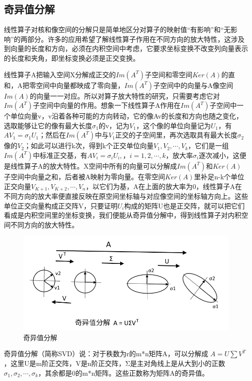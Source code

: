 \subsection{奇异值分解}

线性算子对核和像空间的分解只是简单地区分对算子的映射值“有影响”和“无影响”的两部分。许多的应用希望了解线性算子作用在不同方向的放大特性，这涉及到向量的长度和方向，必须在内积空间中考虑，它要求坐标变换不改变列向量表示的长度和夹角，即坐标变换必须是正交变换。

线性算子A把输入空间X分解成正交的$ Im(A^T) $子空间和零空间$ Ker(A) $的直和，A把零空间中向量都映成了零向量，$ Im(A^T) $子空间中的向量与A像空间$ Im(A) $的向量一一对应。所以对算子放大特性的研究，只需要考虑它对$ Im(A^T) $子空间中向量的作用。想象一下线性算子A作用在$ Im(A^T) $子空间中一个单位向量v，v沿着各种可能的方向转动，它的像Av的长度和方向也随之变化，选取能够让它的像有最大长度$ \sigma_1 $的v，记为$ V_1 $，这个像的单位向量记为$ U_1 $，有$ AV_1=\sigma_1U_1 $；然后在$ Im(A^T) $中与$ V_1 $正交的子空间里，再次选取具有最大长度$ \sigma_2 $像的$ V_2 $；如此可以进行k次，得到k个正交单位向量$ {V_1,V_2,\cdots,V_k} $，它们是一组$ Im(A^T) $中标准正交基，有$ AV_i =\sigma_iU_i,，i=1, 2, \cdots,k $，放大率$ σ_i $逐次减小，这便是线性算子A的放大特性。X空间中所有的向量可以分解成$ Im(A^T) $和$ Ker(A) $子空间中向量之和，后者被A映射为零向量。在零空间$ Ker(A) $里补足n-k个单位正交向量$ {V_{K+1},V_{K+2}, \cdots,V_n} $，以它们为基，A在上面的放大率为0，线性算子A在不同方向的放大率便直接反映在原空间坐标轴与对应像空间的坐标轴方向上。这些单位正交向量构成正交阵V，只要证明$ U_i $构成的矩阵U也是正交阵，就可以把它们看成是内积空间里的坐标变换，我们便能从奇异值分解中，得到线性算子对内积空间不同方向的放大特性。


\begin{figure}[h]
	\centering
	\includegraphics[width=0.7\linewidth]{pic/20450596leeoio001j6199.png}
	\caption{奇异值分解}
	\label{fig:20450596leeoio001j6199}
\end{figure}

\kaishu

奇异值分解（简称SVD）说：对于秩数为r的m*n矩阵A，可以分解成 $ A = U\sum V^T $，这里U是m阶正交阵，V是n阶正交阵，Σ是主对角线上是从大到小的正数$ \sigma_1,\sigma_2, \cdots , \sigma_k $，其余都是0的m*n矩阵。这些正数称为矩阵A的奇异值。

